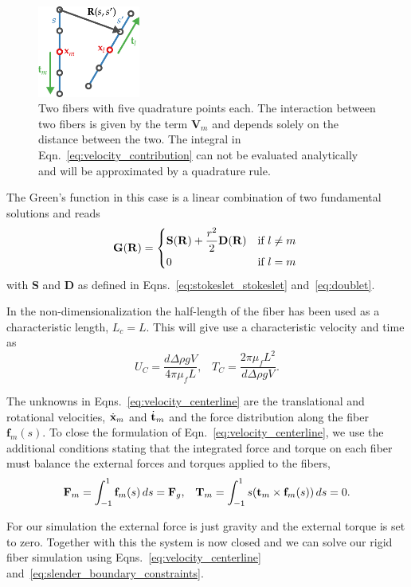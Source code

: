 \begin{figure}[!htbp]
  \centering
  \includegraphics[width=0.3\textwidth]{img/fiber_contribution.pdf}
  \caption[Two interacting fibers with five quadrature points.]{Two fibers with five quadrature points each. The interaction between two fibers is given by the term $\mathbf{V}_m$ and depends solely on the distance between the two. The integral in Eqn.~\eqref{eq:velocity_contribution} can not be evaluated analytically and will be approximated by a quadrature rule.}
  \label{fig:fiber_contribution}
\end{figure}

The Green's function in this case is a linear combination of two fundamental solutions and reads
\begin{equation}
  \label{eq:green_function}
  \mathbf{G}(\mathbf{R}) = \begin{dcases*}
  \mathbf{S}(\mathbf{R}) + \frac{r^2}{2}\mathbf{D}(\mathbf{R}) & if $l \neq m$\\
  0 & if $l = m$
  \end{dcases*}
\end{equation}
with $\mathbf{S}$ and $\mathbf{D}$ as defined in Eqns.~\eqref{eq:stokeslet_stokeslet} and~\eqref{eq:doublet}.

In the non-dimensionalization the half-length of the fiber has been used as a characteristic length, $L_c = L$. This will give use a characteristic velocity and time as
\begin{equation}
  U_C = \frac{d \Delta \rho g V}{4\pi\mu_fL} \text{,} \quad T_C = \frac{2\pi\mu_fL^2}{d \Delta \rho g V} \text{.}
\end{equation}

The unknowns in Eqns.~\eqref{eq:velocity_centerline} are the translational and rotational velocities, $\dot{\mathbf{x}}_m$ and $\dot{\mathbf{t}}_m$ and the force distribution along the fiber $\mathbf{f}_m(s)$. To close the formulation of Eqn.~\eqref{eq:velocity_centerline}, we use the additional conditions stating that the integrated force and torque on each fiber must balance the external forces and torques applied to the fibers,
\begin{equation}
	\label{eq:slender_boundary_constraints}
  \mathbf{F}_m = \int_{-1}^{1} \mathbf{f}_m(s) \, ds = \mathbf{F}_g \text{,} \quad \mathbf{T}_m = \int_{-1}^{1} s(\mathbf{t}_m \times \mathbf{f}_m(s)) \, ds = 0 \text{.}
\end{equation}

For our simulation the external force is just gravity and the external torque is set to zero. Together with this the system is now closed and we can solve our rigid fiber simulation using Eqns.~\eqref{eq:velocity_centerline} and~\eqref{eq:slender_boundary_constraints}.